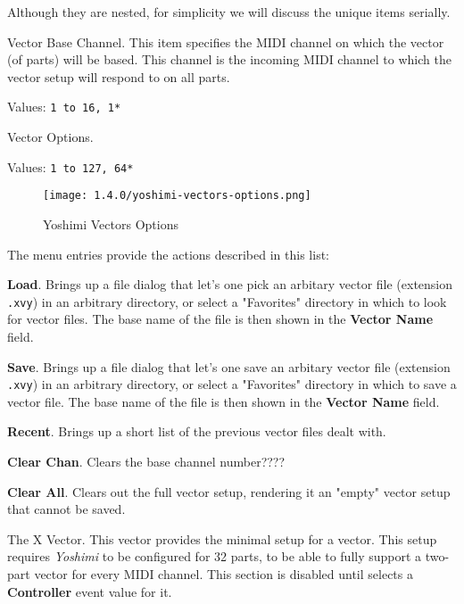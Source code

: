    Although they are nested, for simplicity we will discuss the unique items
   serially.

   \setcounter{ItemCounter}{0}      %

   Vector Base Channel.
   This item specifies the MIDI channel on which the vector (of parts) will be
   based.  This channel is the incoming MIDI channel to which the vector setup
   will respond to on all parts.

   Values: \texttt{1 to 16, 1*}

   Vector Options.

   Values: \texttt{1 to 127, 64*}

\begin{figure}[H]
   \centering 
   \texttt{[image: 1.4.0/yoshimi-vectors-options.png]}
   \caption{Yoshimi Vectors Options}
   \label{fig:yoshimi_vectors_options}
\end{figure}

   The menu entries provide the actions described in this list:

   \begin{enumber}
      \item \textbf{Load}.
         Brings up a file dialog that let's one pick an arbitary vector file
         (extension \texttt{.xvy}) in an arbitrary directory, or select a
         "Favorites" directory in which to look for vector files.
         The base name of the file is then shown in the \textbf{Vector Name}
         field.
      \item \textbf{Save}.
         Brings up a file dialog that let's one save an arbitary vector file
         (extension \texttt{.xvy}) in an arbitrary directory, or select a
         "Favorites" directory in which to save a vector file.
         The base name of the file is then shown in the \textbf{Vector Name}
         field.
      \item \textbf{Recent}.
         Brings up a short list of the previous vector files dealt with.
      \item \textbf{Clear Chan}.
         Clears the base channel number????
      \item \textbf{Clear All}.
         Clears out the full vector setup, rendering it an "empty" vector setup
         that cannot be saved.
   \end{enumber}

   The X Vector.
   This vector provides the minimal setup for a vector.  This setup requires
   \textsl{Yoshimi} to be configured for 32 parts, to be able to fully support
   a two-part vector for every MIDI channel.  This section is disabled until
   selects a \textbf{Controller} event value for it.

